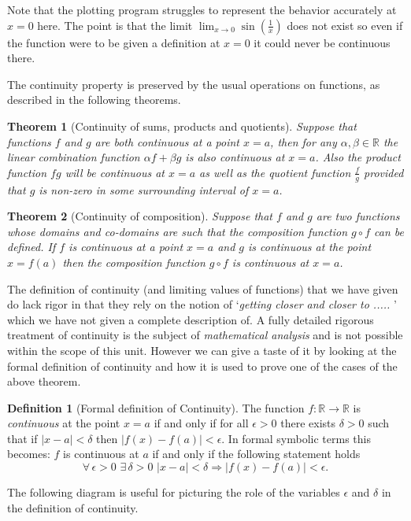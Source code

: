 \documentclass[extrafontsizes, twoside, a4paper]{memoir}
\theoremstyle{plain}%
\newtheorem{thm}{Theorem}[chapter]
\theoremstyle{definition}
\newtheorem{defn}{Definition}[chapter]
\theoremstyle{remark}
\begin{document}
Note that the plotting program struggles to represent the behavior accurately at $x=0$ here. The point is that the limit $\lim_{x \to 0} \sin{(\frac{1}{x})}$ does not exist so even if the function were to be given a definition at $x=0$ it could never be continuous there.

The continuity property is preserved by the usual operations on functions, as described in the following theorems.

\begin{thm}[Continuity of sums, products and quotients]
Suppose that functions $f$ and $g$ are both continuous at a point $x=a$, then for any $\alpha, \beta \in \mathbb{R}$ the linear combination function $\alpha f + \beta g$ is also continuous at $x=a$. Also the product function $fg$ will be continuous at $x=a$ as well as the quotient function $\frac{f}{g}$ provided that $g$ is non-zero in some surrounding interval of $x=a$.
\end{thm}

\begin{thm}[Continuity of composition]
Suppose that $f$ and $g$ are two functions whose domains and co-domains are such that the composition function $g \circ f$ can be defined. If $f$ is continuous at a point $x=a$ and $g$ is continuous at the point $x=f(a)$ then the composition function $g \circ f$ is continuous at $x=a$.
\end{thm}

The definition of continuity (and limiting values of functions) that we have given do lack rigor in that they rely on the notion of `\textit{getting closer and closer to ..... }' which we have not given a complete description of. A fully detailed rigorous treatment of continuity is the subject of \emph{mathematical analysis} and is not possible within the scope of this unit. However we can give a taste of it by looking at the formal definition of continuity and how it is used to prove one of the cases of the above theorem.

\begin{defn}[Formal definition of Continuity]
The function $f:\mathbb{R} \to \mathbb{R}$ is \emph{continuous} at the point $x=a$ if and only if for all $\epsilon > 0$ there exists $\delta > 0$ such that if $|x-a| < \delta$ then $|f(x)-f(a)|< \epsilon$. In formal symbolic terms this becomes: $f$ is continuous at $a$ if and only if the following statement holds
$$ \forall \, \epsilon > 0 \, \, \exists \, \delta > 0 \, \, |x-a|< \delta \Rightarrow |f(x)-f(a)|<\epsilon .$$
\end{defn}
The following diagram is useful for picturing the role of the variables $\epsilon$ and $\delta$ in the definition of continuity.
\end{document}

